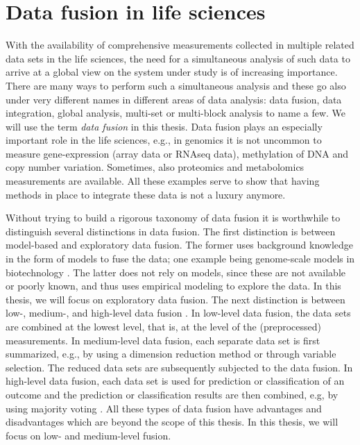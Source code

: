 \section{Data fusion in life sciences}
With the availability of comprehensive measurements collected in multiple related data sets in the life sciences, the need for a simultaneous analysis of such data to arrive at a global view on the system under study is of increasing importance. There are many ways to perform such a simultaneous analysis and these go also under very different names in different areas of data analysis: data fusion, data integration, global analysis, multi-set or multi-block analysis to name a few. We will use the term \emph{data fusion} in this thesis. Data fusion plays an especially important role in the life sciences, e.g., in genomics it is not uncommon to measure gene-expression (array data or RNAseq data), methylation of DNA and copy number variation. Sometimes, also proteomics and metabolomics measurements are available. All these examples serve to show that having methods in place to integrate these data is not a luxury anymore.

Without trying to build a rigorous taxonomy of data fusion it is worthwhile to distinguish several distinctions in data fusion. The first distinction is between model-based and exploratory data fusion. The former uses background knowledge in the form of models to fuse the data; one example being genome-scale models in biotechnology \cite{zimmermann2017integration}. The latter does not rely on models, since these are not available or poorly known, and thus uses empirical modeling to explore the data. In this thesis, we will focus on exploratory data fusion. The next distinction is between low-, medium-, and high-level data fusion \cite{steinmetz1999methodology}. In low-level data fusion, the data sets are combined at the lowest level, that is, at the level of the (preprocessed) measurements. In medium-level data fusion, each separate data set is first summarized, e.g., by using a dimension reduction method or through variable selection. The reduced data sets are subsequently subjected to the data fusion. In high-level data fusion, each data set is used for prediction or classification of an outcome and the prediction or classification results are then combined, e.g, by using majority voting \cite{doeswijk2011increase}. All these types of data fusion have advantages and disadvantages which are beyond the scope of this thesis. In this thesis, we will focus on low- and medium-level fusion.

